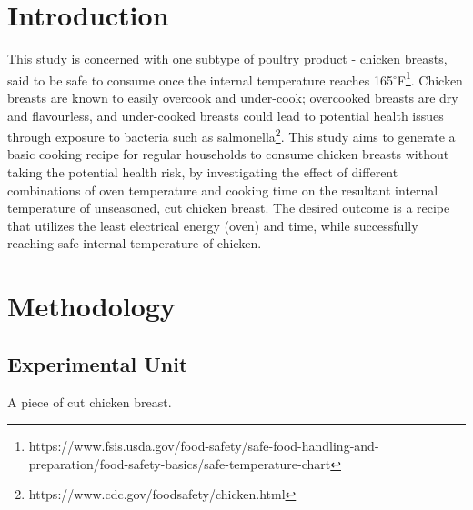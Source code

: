 \documentclass[a4paper]{article}
\begin{document}
\section{Introduction} \label{Introduction}
\vspace{-0.25cm}
\hspace{1cm}This study is concerned with one subtype of poultry product - chicken breasts, said to be safe to consume once the internal temperature reaches 165$^{\circ}$F\footnote{https://www.fsis.usda.gov/food-safety/safe-food-handling-and-preparation/food-safety-basics/safe-temperature-chart}. Chicken breasts are known to easily overcook and under-cook; overcooked breasts are dry and flavourless, and under-cooked breasts could lead to potential health issues through exposure to bacteria such as salmonella\footnote{https://www.cdc.gov/foodsafety/chicken.html}. This study aims to generate a basic cooking recipe for regular households to consume chicken breasts without taking the potential health risk, by investigating the effect of different combinations of oven temperature and cooking time on the resultant internal temperature of unseasoned, cut chicken breast. The desired outcome is a recipe that utilizes the least electrical energy (oven) and time, while successfully reaching safe internal temperature of chicken.

\section{Methodology} \label{Methodology}
\vspace{-0.25cm}

\subsection{Experimental Unit}\label{Experimental Unit}
\vspace{-0.25cm}
\hspace{0.5cm}A piece of cut chicken breast.
\end{document}
